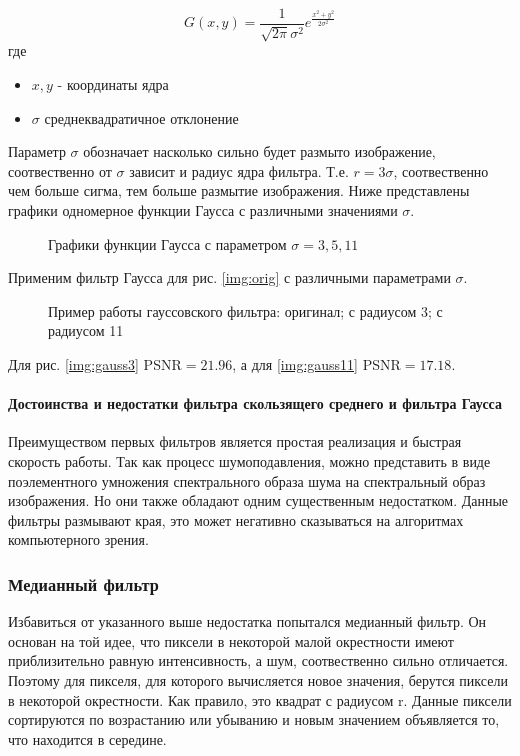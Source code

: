 \begin{equation}
	G(x,y) = \frac{1}{\sqrt{2\pi}\sigma^2}e^{\frac{x^2+y^2}{2\sigma^2}}
\end{equation}
где
\begin{itemize}
	\item $x,y$ - координаты ядра
	\item $\sigma$ среднеквадратичное отклонение
\end{itemize}

Параметр $\sigma$ обозначает насколько сильно будет размыто изображение, соотвественно от $\sigma$ зависит и радиус ядра фильтра. Т.е. $r=3\sigma$, соотвественно чем больше сигма, тем больше размытие изображения. Ниже представлены графики одномерное функции Гаусса с различными значениями $\sigma$.

\begin{figure}[H]
	\caption{Графики функции Гаусса с параметром $\sigma = 3,5,11$}
\end{figure}

Применим фильтр Гаусса для рис. \ref{img:orig} с различными параметрами $\sigma$.

\begin{figure}[H]
	\centering
	\hspace{0.0125ex}
	\hspace{0.0125ex}
	\caption{Пример работы гауссовского фильтра:  оригинал;  с радиусом 3;  с радиусом 11}
\end{figure}
Для рис. \ref{img:gauss3} PSNR$=21.96$, а для \ref{img:gauss11} PSNR$=17.18$.
\paragraph{Достоинства и недостатки  фильтра скользящего среднего и фильтра Гаусса}
Преимуществом первых фильтров является простая реализация и быстрая скорость работы. Так как процесс шумоподавления, можно представить в виде поэлементного умножения спектрального образа шума на спектральный образ изображения. Но они также обладают одним существенным недостатком. Данные фильтры размывают края, это может негативно сказываться на алгоритмах компьютерного зрения.
\subsubsection{Медианный фильтр}
Избавиться от указанного выше недостатка попытался медианный фильтр. Он основан на той идее, что пиксели в некоторой малой окрестности имеют приблизительно равную интенсивность, а шум, соотвественно сильно отличается. Поэтому для пикселя, для которого вычисляется новое значения, берутся пиксели в некоторой окрестности. Как правило, это квадрат с радиусом r. Данные пиксели сортируются по возрастанию или убыванию и новым значением объявляется то, что находится в середине.


